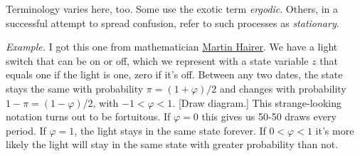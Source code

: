 \documentclass[11pt]{article}
\begin{document}
\begin{itemize}
Terminology varies here, too.
Some use the exotic term {\it ergodic\/}.
Others, in a successful attempt to spread confusion, refer to such processes
as {\it stationary\/}.
\end{itemize}


{\it Example.\/} I got this one from mathematician
\href{http://www.hairer.org/notes/Markov.pdf}{Martin Hairer}.
We have a light switch that can be on or off,
which we represent with a state variable $z$ that equals one if the light is one, zero if it's off.
Between any two dates, the state stays the same with probability $\pi = (1+\varphi)/2$
and changes with probability $1- \pi = (1-\varphi)/2$, with $ - 1 < \varphi < 1 $.
[Draw diagram.]
This strange-looking notation turns out to be fortuitous.
If $\varphi = 0$ this gives us 50-50 draws every period.
If $ \varphi = 1$, the light stays in the same state forever.
If $0 < \varphi < 1$ it's more likely the light will stay in the same state with greater
probability than not.
\end{document}
